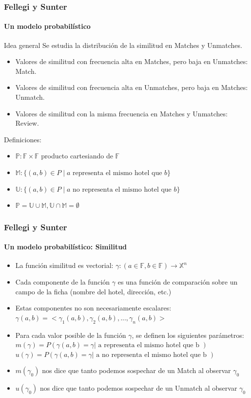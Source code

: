 \documentclass{beamer}
\begin{document}
\begin{frame}
	\frametitle{Fellegi y Sunter}
	\framesubtitle{Un modelo probabilístico}
	\small
	\begin{block}{Idea general}
      Se estudia la distribución de la similitud en Matches y Unmatches. 
	\begin{itemize}
      \item Valores de similitud con frecuencia alta en Matches, pero baja en Unmatches: Match.
      \item Valores de similitud con frecuencia alta en Unmatches, pero baja en Matches: Unmatch.
      \item Valores de similitud con la misma frecuencia en  Matches y Unmatches: Review.
    \end{itemize} 
	\end{block}
  Definiciones:
	  \begin{itemize}
      \item
      $\mathbb{P}: \mathbb{F}\times \mathbb{F}$ producto cartesiando de $\mathbb{F}$
      \item
      $\mathbb{M}: \{(a,b) \in P  \mid a\text{ representa el mismo hotel que }b\}$
      \item
      $\mathbb{U}: \{(a,b) \in P  \mid a\text{ no representa el mismo hotel que }b\}$
      \item
      $\mathbb{P} = \mathbb{U} \cup \mathbb{M}, \mathbb{U} \cap \mathbb{M} = \emptyset$
    \end{itemize} 
\end{frame}

\begin{frame}
	\frametitle{Fellegi y Sunter}
	\framesubtitle{Un modelo probabilístico: Similitud}
	  \begin{itemize}
      \item La función similitud es vectorial:
      $\gamma:(a \in \mathbb{F}, b \in \mathbb{F}) \rightarrow  \mathbb{X}^{n}$ \\
      \item Cada componente de la función $\gamma$ es una función de comparación sobre un campo de la ficha (nombre del hotel, dirección, etc.) 
      \item Estas componentes no son necesariamente escalares:
      $\gamma(a, b) = <\gamma_1(a, b), \gamma_2(a, b), ..., \gamma_n(a, b)>$
      \item Para cada valor posible de la función $\gamma$, se definen los siguientes parámetros:
      $m(\gamma) = P(\gamma(a, b)=\gamma | \text{ a representa el mismo hotel que b })$
      $u(\gamma) = P(\gamma(a, b)=\gamma | \text{ a no representa el mismo hotel que b })$
      \item $m(\gamma_0)$ nos dice que tanto podemos sospechar de un Match al observar $\gamma_0$
      \item $u(\gamma_0)$ nos dice que tanto podemos sospechar de un Unmatch al observar $\gamma_0$    
      \end{itemize} 
\end{frame}
\end{document}
